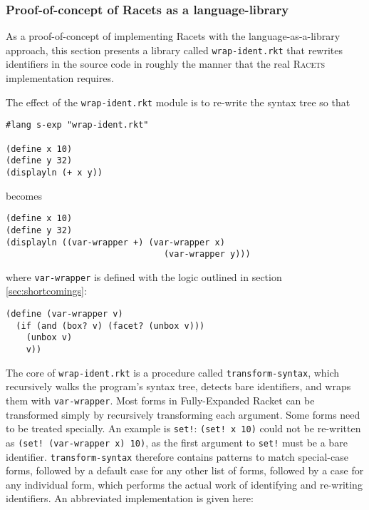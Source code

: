 \documentclass{article}
\begin{document}
\subsubsection{Proof-of-concept of Racets as a language-library}
As a proof-of-concept of implementing Racets with the language-as-a-library approach, this section presents a library called \texttt{wrap-ident.rkt} that rewrites identifiers in the source code in roughly the manner that the real \textsc{Racets} implementation requires.

The effect of the \texttt{wrap-ident.rkt} module is to re-write the syntax tree so that

\begin{lstlisting}
#lang s-exp "wrap-ident.rkt"

(define x 10)
(define y 32)
(displayln (+ x y))
\end{lstlisting}

\noindent becomes

\begin{lstlisting}
(define x 10)
(define y 32)
(displayln ((var-wrapper +) (var-wrapper x)
                               (var-wrapper y)))
\end{lstlisting}

\noindent where \texttt{var-wrapper} is defined with the logic outlined in section \ref{sec:shortcomings}:

\begin{lstlisting}
(define (var-wrapper v)
  (if (and (box? v) (facet? (unbox v)))
    (unbox v)
    v))
\end{lstlisting}

The core of \texttt{wrap-ident.rkt} is a procedure called \texttt{transform-syntax}, which recursively walks the program's syntax tree, detects bare identifiers, and wraps them with \texttt{var-wrapper}. Most forms in Fully-Expanded Racket can be transformed simply by recursively transforming each argument. Some forms need to be treated specially. An example is \texttt{set!}: \texttt{(set! x 10)} could not be re-written as \texttt{(set! (var-wrapper x) 10)}, as the first argument to \texttt{set!} must be a bare identifier. \texttt{transform-syntax} therefore contains patterns to match special-case forms, followed by a default case for any other list of forms, followed by a case for any individual form, which performs the actual work of identifying and re-writing identifiers. An abbreviated implementation is given here:
\end{document}
